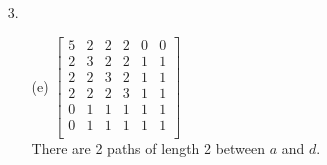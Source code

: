 \documentclass[letterpaper,fleqn]{article}
\begin{document}
\begin{enumerate}
\begin{enumerate}
			\item [3.] \quad
			\begin{enumerate}
				\item [(e)]
				$\begin{bmatrix*}
					5 & 2 & 2 & 2 & 0 & 0 \\
					2 & 3 & 2 & 2 & 1 & 1 \\
					2 & 2 & 3 & 2 & 1 & 1 \\
					2 & 2 & 2 & 3 & 1 & 1 \\
					0 & 1 & 1 & 1 & 1 & 1 \\
					0 & 1 & 1 & 1 & 1 & 1 \\
				\end{bmatrix*}$ \\
				There are 2 paths of length 2 between $a$ and $d$.
			\end{enumerate}
		\end{enumerate}
	\end{enumerate}
\end{document}
